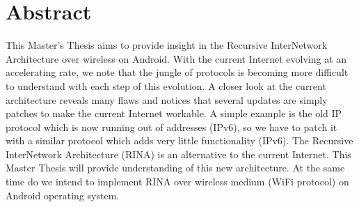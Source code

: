 \newpage

\chapter*{Abstract}


\begin{slshape}




This Master's Thesis aims to provide insight in the Recursive InterNetwork Architecture over wireless on Android. With the current Internet evolving at an accelerating rate, we note that the jungle of protocols is becoming more difficult to understand with each step of this evolution. A closer look at the current architecture reveals many flaws and notices that several updates are simply patches to make the current Internet workable. A simple example is the old IP protocol which is now running out of addresses (IPv6), so we have to patch it with a similar protocol which adds very little functionality (IPv6). The Recursive InterNetwork Architecture (RINA) is an alternative to the current Internet. This Master Thesis will provide understanding of this new architecture. At the same time do we intend to implement RINA over wireless medium (WiFi protocol) on Android operating system.


\end{slshape}
